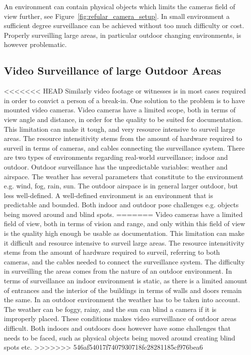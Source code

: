 An environment can contain physical objects which limits the cameras field of view further, see Figure~\ref{fig:refular_camera_setup}.
In small environment a sufficient degree surveillance can be achieved without too much difficulty or cost.
Properly surveilling large areas, in particular outdoor changing environments, is however problematic.

\subsection{Video Surveillance of large Outdoor Areas}\label{subsec:surveillance_of_large_outdoor_areas}
<<<<<<< HEAD
Similarly video footage or witnesses is in most cases required in order to convict a person of a break-in.
One solution to the problem is to have mounted video cameras.
Video cameras have a limited scope, both in terms of view angle and distance, in order for the quality to be suited for documentation.
This limitation can make it tough, and very resource intensive to surveil large areas.
The resource intensitivity stems from the amount of hardware required to surveil in terms of cameras, and cables connecting the surveillance system.
There are two types of environments regarding real-world surveillance; indoor and outdoor.
Outdoor surveillance has the unpredictable variables: weather and airspace.
The weather has several parameters that constitute to the environment e.g. wind, fog, rain, sun.
The outdoor airspace is in general larger outdoor, but less well-defined.
A well-defined environment is an environment that is predictable and bounded.
Both indoor and outdoor pose challenges e.g. objects being moved around and blind spots.
=======
Video cameras have a limited field of view, both in terms of vision and range, and only within this field of view is the quality high enough be usable as documentation.
This limitation can make it difficult and resource intensive to surveil large areas.
The resource intensitivity stems from the amount of hardware required to surveil, referring to both cameras, and the cables needed to connect the surveillance system.
The difficulty in surveilling the areas comes from the nature of an outdoor environment.
In terms of surveillance an indoor environment is static, as there is a limited amount of entrances and the interior of the buildings in terms of walls and doors remain the same.
In an outdoor environment the weather has to be taken into account.
The weather can be foggy, rainy, and the sun can blind a camera if it is improperly placed.
These conditions makes video surveillance of outdoor areas difficult.
Both indoors and outdoors does however have some challenges that needs to be faced, such as physical objects being moved around creating blind spots etc.
>>>>>>> 546af54017f7407930718fc28281185cf976bea6

